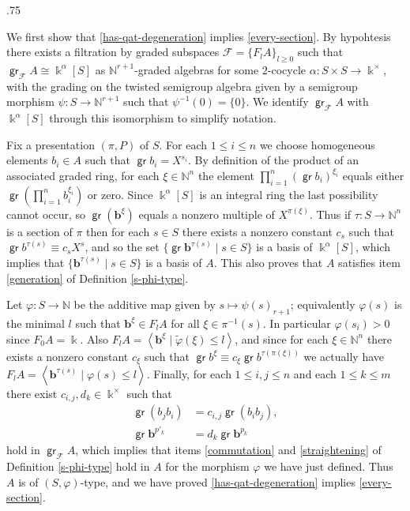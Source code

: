 \documentclass[11pt,fleqn]{article}
\makeatletter
\renewenvironment{proof}[1][\textit{Proof}]{\par
  \pushQED{\qed}%
  \normalfont \topsep.75\paraskip\relax
  \trivlist
  \item[\hskip\labelsep
        \itshape
    #1\@addpunct{.}]\ignorespaces
}{%
  \popQED\endtrivlist\@endpefalse
}
\newcommand\NN{\mathbb N}
\renewcommand\to{\longrightarrow}
\renewcommand\phi{\varphi}
\newcommand\vspan[1]{\left\langle #1 \right\rangle}
\newcommand\F{\mathcal F}
\newcommand\tphi{\tilde \phi}
\renewcommand\b{\mathbf b}
\renewcommand\k{\Bbbk}
\DeclareMathOperator\gr{\mathsf{gr}}
\makeatother
\begin{document}
\begin{proof}
We first show that \ref{has-qat-degeneration} implies \ref{every-section}. By hypohtesis
there exists a filtration by graded subspaces $\F = \{F_lA\}_{l \geq 0}$ such that 
$\gr_\F A \cong \k^\alpha[S]$ as $\NN^{r+1}$-graded algebras for some $2$-cocycle 
$\alpha: S \times S \to \k^\times$, with the grading on the twisted semigroup algebra 
given by a semigroup morphism $\psi: S \to \NN^{r+1}$ such that $\psi^{-1}(0) = \{0\}$. 
We  identify $\gr_\F A$ with $\k^\alpha[S]$ through this isomorphism to simplify notation. 

Fix a presentation $(\pi, P)$ of $S$.
For each $1 \leq i \leq n$ we choose homogeneous elements $b_i \in A$ such that 
$\gr b_i = X^{s_i}$. By definition of the product of an associated graded ring, for each 
$\xi \in \NN^n$ the element $\prod_{i = 1}^n (\gr b_i)^{\xi_i}$ equals either 
$\gr \left(\prod_{i = 1}^n b_i^{\xi_i}\right)$ or zero. Since $\k^\alpha[S]$ is an
integral ring the last possibility cannot occur, so $\gr (\b^\xi)$ equals a nonzero 
multiple of $X^{\pi(\xi)}$. Thus if $\tau: S \to \NN^n$ is a section of $\pi$ then for
each $s \in S$ there exists a nonzero constant $c_s$ such that $\gr b^{\tau(s)}
\equiv c_s X^s$, and so the set $\{\gr \b^{\tau(s)} \mid s \in S\}$ is a basis of 
$\k^\alpha[S]$, which implies that $\{\b^{\tau(s)} \mid s \in S\}$ is a basis of $A$. 
This also proves that $A$ satisfies item \ref{generation} of Definition \ref{s-phi-type}.

Let $\phi: S \to \NN$ be the additive map given by $s \mapsto \psi(s)_{r+1}$; 
equivalently $\phi(s)$ is the minimal $l$ such that $\b^\xi \in F_l A$ for all $\xi 
\in \pi^{-1}(s)$. In particular $\phi(s_i) > 0$ since $F_0A = \k$. Also $F_lA = 
\vspan{\b^\xi \mid \tphi(\xi) \leq l}$, and since for each $\xi \in \NN^n$ there exists 
a nonzero constant $c_\xi$ such that $\gr b^\xi \equiv c_\xi \gr b^{\tau(\pi(\xi))}$ we 
actually have $F_lA = \vspan{\b^{\tau(s)} \mid \phi(s) \leq l}$. Finally, for each $1 
\leq i,j \leq n$ and each $1 \leq k \leq m$ there exist $c_{i,j}, d_k \in \k^\times$ 
such that
\begin{align*}
  \gr (b_j b_i) &= c_{i,j} \gr (b_i b_j),\\
  \gr \b^{p'_k} &= d_k \gr \b^{p_k}
\end{align*}
hold in $\gr_\F A$, which implies that items \ref{commutation} and 
\ref{straightening} of Definition \ref{s-phi-type} hold in $A$ for the morphism
$\phi$ we have just defined. Thus $A$ is of $(S,\phi)$-type, and we have proved 
\ref{has-qat-degeneration} implies \ref{every-section}.


\end{proof}
\end{document}
